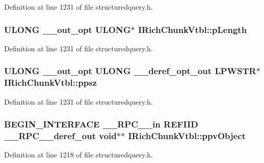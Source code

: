 Definition at line 1231 of file structuredquery.\+h.

\subsubsection[{\texorpdfstring{p\+Length}{pLength}}]{ {\bf U\+L\+O\+NG} {\bf \+\_\+\+\_\+out\+\_\+opt} {\bf U\+L\+O\+NG}$\ast$ I\+Rich\+Chunk\+Vtbl\+::p\+Length}\hypertarget{struct_i_rich_chunk_vtbl_a1c86628815d0454f86afb2c82889741f}{}\label{struct_i_rich_chunk_vtbl_a1c86628815d0454f86afb2c82889741f}


Definition at line 1231 of file structuredquery.\+h.

\subsubsection[{\texorpdfstring{ppsz}{ppsz}}]{ {\bf U\+L\+O\+NG} {\bf \+\_\+\+\_\+out\+\_\+opt} {\bf U\+L\+O\+NG} {\bf \+\_\+\+\_\+deref\+\_\+opt\+\_\+out} {\bf L\+P\+W\+S\+TR}$\ast$ I\+Rich\+Chunk\+Vtbl\+::ppsz}\hypertarget{struct_i_rich_chunk_vtbl_a2b7db97f4d16e2075d0acced283e2328}{}\label{struct_i_rich_chunk_vtbl_a2b7db97f4d16e2075d0acced283e2328}


Definition at line 1231 of file structuredquery.\+h.

\subsubsection[{\texorpdfstring{ppv\+Object}{ppvObject}}]{\setlength{\rightskip}{0pt plus 5cm}B\+E\+G\+I\+N\+\_\+\+I\+N\+T\+E\+R\+F\+A\+CE {\bf \+\_\+\+\_\+\+R\+P\+C\+\_\+\+\_\+in} {\bf R\+E\+F\+I\+ID} {\bf \+\_\+\+\_\+\+R\+P\+C\+\_\+\+\_\+deref\+\_\+out} {\bf void}$\ast$$\ast$ I\+Rich\+Chunk\+Vtbl\+::ppv\+Object}\hypertarget{struct_i_rich_chunk_vtbl_ab8607754b8af4a854b417de71c2fad74}{}\label{struct_i_rich_chunk_vtbl_ab8607754b8af4a854b417de71c2fad74}


Definition at line 1218 of file structuredquery.\+h.

